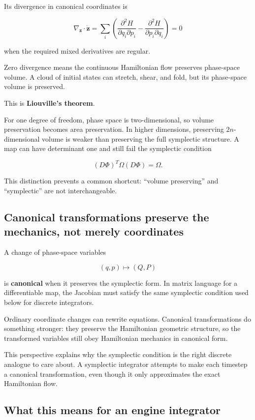 Its divergence in canonical coordinates is

\[
\nabla_{\mathbf z}\cdot\dot{\mathbf z}
=
\sum_i
\left(
\frac{\partial^2H}{\partial q_i\partial p_i}
-
\frac{\partial^2H}{\partial p_i\partial q_i}
\right)
=0
\]

when the required mixed derivatives are regular.

Zero divergence means the continuous Hamiltonian flow preserves phase-space volume. A cloud of initial states can stretch, shear, and fold, but its phase-space volume is preserved.

This is \textbf{Liouville's theorem}.

For one degree of freedom, phase space is two-dimensional, so volume preservation becomes area preservation. In higher dimensions, preserving \(2n\)-dimensional volume is weaker than preserving the full symplectic structure. A map can have determinant one and still fail the symplectic condition

\[
(D\Phi)^T\Omega(D\Phi)=\Omega.
\]

This distinction prevents a common shortcut: ``volume preserving'' and ``symplectic'' are not interchangeable.

\subsection{Canonical transformations preserve the mechanics, not merely coordinates}\label{02-foundations-ii-ch025-canonical-transformations-preserve-the-mechanics-not-merely-coordinates}

A change of phase-space variables

\[
(q,p)\mapsto(Q,P)
\]

is \textbf{canonical} when it preserves the symplectic form. In matrix language for a differentiable map, the Jacobian must satisfy the same symplectic condition used below for discrete integrators.

Ordinary coordinate changes can rewrite equations. Canonical transformations do something stronger: they preserve the Hamiltonian geometric structure, so the transformed variables still obey Hamiltonian mechanics in canonical form.

This perspective explains why the symplectic condition is the right discrete analogue to care about. A symplectic integrator attempts to make each timestep a canonical transformation, even though it only approximates the exact Hamiltonian flow.

\subsection{What this means for an engine integrator}\label{02-foundations-ii-ch025-what-this-means-for-an-engine-integrator}


